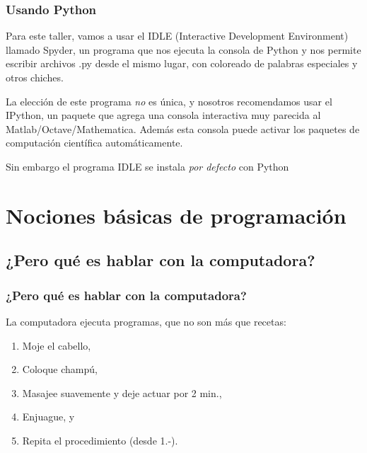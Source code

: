 \documentclass{beamer}
\begin{document}
\begin{frame}
    \frametitle{Usando Python}
    Para este taller, vamos a usar el IDLE (Interactive Development Environment) llamado Spyder, un programa que nos ejecuta la consola de Python y nos permite escribir archivos .py desde el mismo lugar, con coloreado de palabras especiales y otros chiches. 
    
    La elección de este programa \emph{no} es única, y nosotros recomendamos usar el IPython, un paquete que agrega una consola interactiva muy parecida al Matlab/Octave/Mathematica. Además esta consola puede activar los paquetes de computación científica automáticamente. 
    
    Sin embargo el programa IDLE se instala \emph{por defecto} con Python

\end{frame}



\section{Nociones básicas de programación}

\subsection{¿Pero qué es hablar con la computadora?}
\begin{frame}
    \frametitle{¿Pero qué es hablar con la computadora?}
    La computadora ejecuta programas, que no son más que recetas:
    \begin{enumerate}
        \item Moje el cabello,
        \item Coloque champú,
        \item Masajee suavemente y deje actuar por 2 min.,
        \item Enjuague, y
        \item Repita el procedimiento (desde 1.-).
    \end{enumerate}
    
\end{frame}
\end{document}
